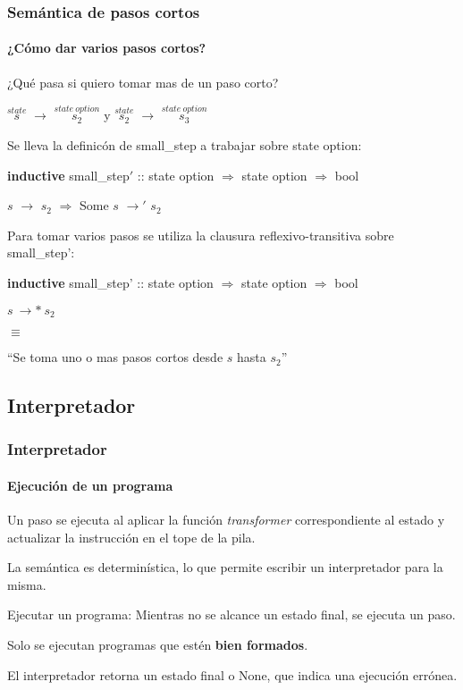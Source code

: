 \begin{frame}
\frametitle{Semántica de pasos cortos}
\framesubtitle{¿Cómo dar varios pasos cortos?}

¿Qué pasa si quiero tomar mas de un paso corto?

\bigskip

$\overset{state}{s}$ $\rightarrow$ $\overset{state\ option}{s_2}$ y $\overset{state}{s_2}$ $\rightarrow$ $\overset{state\ option}{s_3}$

\bigskip
\pause

Se lleva la definicón de small\_step a trabajar sobre state option:

\bigskip
\textbf{inductive} small\_step$'$ :: state option $\Rightarrow$ state option $\Rightarrow$ bool
\bigskip

$s$ $\rightarrow$ $s_2$ $\Longrightarrow$ Some $s$ $\rightarrow'$ $s_2$
\bigskip
\pause

Para tomar varios pasos se utiliza la clausura reflexivo-transitiva sobre small\_step':

\bigskip
\textbf{inductive} small\_step' :: state option $\Rightarrow$ state option $\Rightarrow$ bool
\bigskip

$s\ \rightarrow*\ s_2$

$\equiv$

``Se toma uno o mas pasos cortos desde $s$ hasta $s_2$''



\end{frame}


\subsection{Interpretador}


\begin{frame}
\frametitle{Interpretador}
\framesubtitle{Ejecución de un programa}

Un paso se ejecuta al aplicar la función \textit{transformer} correspondiente al estado y actualizar la instrucción en el tope de la pila.
\bigskip
\pause

La semántica es determinística, lo que permite escribir un interpretador para la misma.
\bigskip
\pause

\begin{block}{Ejecutar un programa:}
Mientras no se alcance un estado final, se ejecuta un paso.
\end{block}

\pause

Solo se ejecutan programas que estén \textbf{bien formados}.

\bigskip

El interpretador retorna un estado final o None, que indica una ejecución errónea.

\end{frame}

